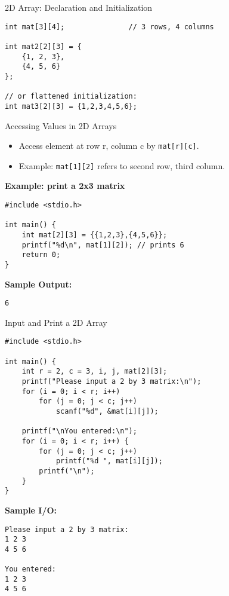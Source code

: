 \documentclass[12pt, aspectratio=169]{beamer}
\begin{document}
    \begin{frame}[fragile]{2D Array: Declaration and Initialization}
        \begin{verbatim}
int mat[3][4];               // 3 rows, 4 columns

int mat2[2][3] = {
    {1, 2, 3},
    {4, 5, 6}
};

// or flattened initialization:
int mat3[2][3] = {1,2,3,4,5,6};
        \end{verbatim}
    \end{frame}

    \begin{frame}[fragile]{Accessing Values in 2D Arrays}
        \begin{itemize}
            \item Access element at row r, column c by \texttt{mat[r][c]}.
            \item Example: \texttt{mat[1][2]} refers to second row, third column.
        \end{itemize}

        \textbf{Example: print a 2x3 matrix}
        \begin{verbatim}
#include <stdio.h>

int main() {
    int mat[2][3] = {{1,2,3},{4,5,6}};
    printf("%d\n", mat[1][2]); // prints 6
    return 0;
}
        \end{verbatim}

        \textbf{Sample Output:}
        \begin{verbatim}
6
        \end{verbatim}
    \end{frame}

    \begin{frame}[fragile]{Input and Print a 2D Array}
        \begin{verbatim}
#include <stdio.h>

int main() {
    int r = 2, c = 3, i, j, mat[2][3];
    printf("Please input a 2 by 3 matrix:\n");
    for (i = 0; i < r; i++)
        for (j = 0; j < c; j++)
            scanf("%d", &mat[i][j]);

    printf("\nYou entered:\n");
    for (i = 0; i < r; i++) {
        for (j = 0; j < c; j++)
            printf("%d ", mat[i][j]);
        printf("\n");
    }
}
        \end{verbatim}

        \textbf{Sample I/O:}
\begin{verbatim}
Please input a 2 by 3 matrix:
1 2 3
4 5 6

You entered:
1 2 3
4 5 6
\end{verbatim}
    \end{frame}
\end{document}
